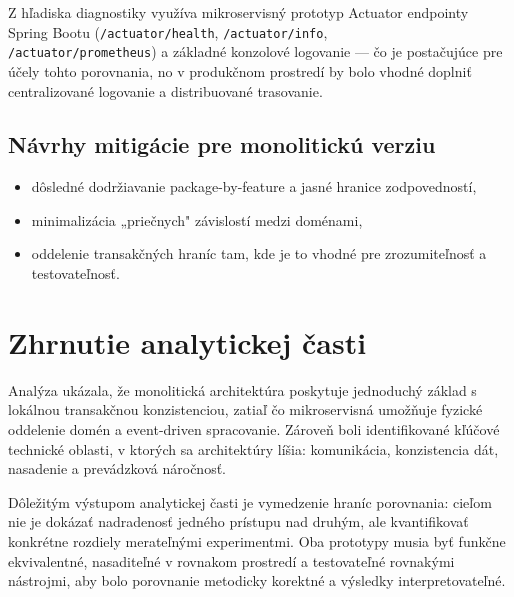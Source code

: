 Z hľadiska diagnostiky využíva mikroservisný prototyp Actuator endpointy Spring Bootu (\texttt{/actuator/health}, \texttt{/actuator/info}, \\ \texttt{/actuator/prometheus}) a základné konzolové logovanie — čo je postačujúce pre účely tohto porovnania, no v produkčnom prostredí by bolo vhodné doplniť centralizované logovanie a distribuované trasovanie.

\subsection*{Návrhy mitigácie pre monolitickú verziu}
\begin{itemize}
    \item dôsledné dodržiavanie package-by-feature a jasné hranice zodpovedností,
    \item minimalizácia „priečnych" závislostí medzi doménami,
    \item oddelenie transakčných hraníc tam, kde je to vhodné pre zrozumiteľnosť a testovateľnosť.
\end{itemize}

\section{Zhrnutie analytickej časti}

Analýza ukázala, že monolitická architektúra poskytuje jednoduchý základ s lokálnou transakčnou konzistenciou, zatiaľ čo mikroservisná umožňuje fyzické oddelenie domén a event-driven spracovanie. Zároveň boli identifikované kľúčové technické oblasti, v ktorých sa architektúry líšia: komunikácia, konzistencia dát, nasadenie a prevádzková náročnosť.

Dôležitým výstupom analytickej časti je vymedzenie hraníc porovnania: cieľom nie je dokázať nadradenosť jedného prístupu nad druhým, ale kvantifikovať konkrétne rozdiely merateľnými experimentmi. Oba prototypy musia byť funkčne ekvivalentné, nasaditeľné v rovnakom prostredí a testovateľné rovnakými nástrojmi, aby bolo porovnanie metodicky korektné a výsledky interpretovateľné.
